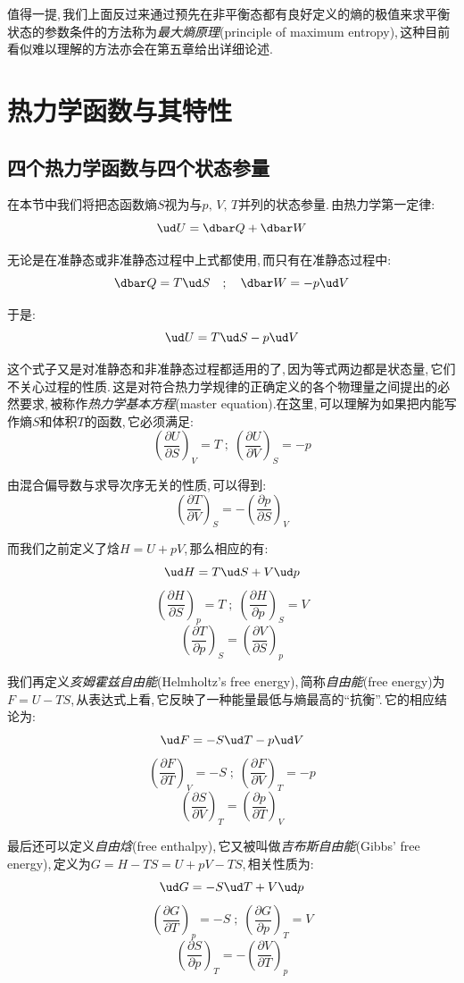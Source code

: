 值得一提,\,我们上面反过来通过预先在非平衡态都有良好定义的熵的极值来求平衡状态的参数条件的方法称为\emph{最大熵原理}(principle of maximum entropy),\,这种目前看似难以理解的方法亦会在第五章给出详细论述.



\section{热力学函数与其特性}

\subsection{四个热力学函数与四个状态参量}

在本节中我们将把态函数熵$S$视为与$p,\,V,\,T$并列的状态参量.\,由热力学第一定律:
\[\ud U=\dbar Q+\dbar W\]

无论是在准静态或非准静态过程中上式都使用,\,而只有在准静态过程中:
\[\dbar Q= T\ud S\quad;\quad \dbar W=-p\ud V\]

于是:
\[\ud U= T\ud S -p\ud V\]

这个式子又是对准静态和非准静态过程都适用的了,\,因为等式两边都是状态量,\,它们不关心过程的性质.\,这是对符合热力学规律的正确定义的各个物理量之间提出的必然要求,\,被称作\emph{热力学基本方程}(master equation).\.在这里,\,可以理解为如果把内能写作熵$S$和体积$T$的函数,\,它必须满足:
\[\left(\frac{\partial U}{\partial S}\right)_V=T\; ; \; \left(\frac{\partial U}{\partial V}\right)_S=-p\]

由混合偏导数与求导次序无关的性质,\,可以得到:
\[\left(\frac{\partial T}{\partial V}\right)_S=-\left(\frac{\partial p}{\partial S}\right)_V\]

而我们之前定义了焓$H=U+pV$,\,那么相应的有:
\[\ud H= T\ud S +V\ud p\]
\[\left(\frac{\partial H}{\partial S}\right)_p=T\; ; \; \left(\frac{\partial H}{\partial p}\right)_S=V\]
\[\left(\frac{\partial T}{\partial p}\right)_S=\left(\frac{\partial V}{\partial S}\right)_p\]

我们再定义\emph{亥姆霍兹自由能}(Helmholtz's free energy),\,简称\emph{自由能}(free energy)为$F=U-TS$,\,从表达式上看,\,它反映了一种能量最低与熵最高的``抗衡''.\,它的相应结论为:
\[\ud F=- S\ud T -p\ud V\]
\[\left(\frac{\partial F}{\partial T}\right)_V=-S\; ; \; \left(\frac{\partial F}{\partial V}\right)_T=-p\]
\[\left(\frac{\partial S}{\partial V}\right)_T=\left(\frac{\partial p}{\partial T}\right)_V\]

最后还可以定义\emph{自由焓}(free enthalpy),\,它又被叫做\emph{吉布斯自由能}(Gibbs' free energy),\,定义为$G=H-TS=U+pV-TS$,\,相关性质为:
\[\ud G=- S\ud T +V\ud p\]
\[\left(\frac{\partial G}{\partial T}\right)_p=-S\; ; \; \left(\frac{\partial G}{\partial p}\right)_T=V\]
\[\left(\frac{\partial S}{\partial p}\right)_T=-\left(\frac{\partial V}{\partial T}\right)_p\]

